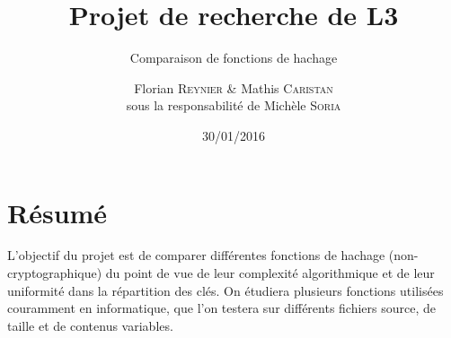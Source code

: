 \documentclass[final,twoside,article,10pt]{scrartcl}
\begin{document}
%
\title{Projet de recherche de L3}
\subtitle{Comparaison de fonctions de hachage}
\author{Florian \textsc{Reynier} \& Mathis \textsc{Caristan}\\ \footnotesize{sous la responsabilité de Michèle \textsc{Soria}}}
%
\date{30/01/2016}

\maketitle

\section*{Résumé }
	\label{sec:resume}
	L'objectif du projet est de comparer différentes fonctions de hachage (non-cryptographique) du point de vue de leur complexité algorithmique et de leur uniformité dans la répartition des clés. On étudiera plusieurs fonctions utilisées couramment en informatique, que l'on testera sur différents fichiers source, de taille et de contenus variables.
	
	
\end{document}
